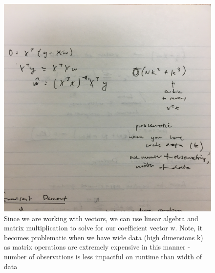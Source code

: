 \begin{figure}[ht]
  \begin{center}
    \includegraphics[width=.9\textwidth,angle=270]{figures/6.jpg}
    \caption{
      Since we are working with vectors, we can use linear algebra and matrix multiplication to solve for our coefficient vector w. Note, it becomes problematic when we have wide data (high dimensions k) as matrix operations are extremely expensive in this manner - number of observations is less impactful on runtime than width of data}
    \label{fig:example_figure8}
  \end{center}
\end{figure}

\pagebreak

